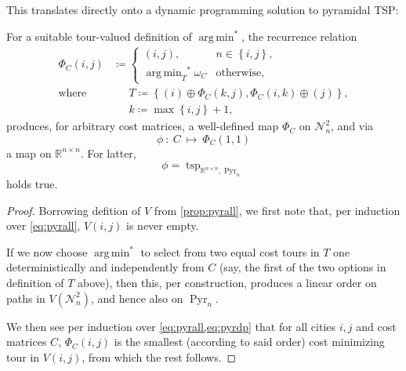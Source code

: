 \documentclass[index=totoc,bibliography=totoc]{scrartcl}
\newcommand{\annotation}[1]{\marginpar{\small\itshape\color{green}#1}}
\DeclareMathOperator*{\argmin}{arg\,min}
\numberwithin{equation}{section}
\numberwithin{figure}{section}
\numberwithin{table}{section}
\begin{document}
This translates directly onto a dynamic programming solution to pyramidal TSP:
\begin{corollary}
\label{cor:pyrdp}
\annotation{improve layout}
  For a suitable tour-valued definition of $\argmin^\ast$, the recurrence relation
  \begin{align}
    \label{eq:pyrdp}
    \Phi_C\left(i,j\right) & \coloneqq
    \begin{cases}
      \left(i,j\right), & n \in \left\{i,j\right\}, \\
      {\displaystyle \argmin_T}^\ast \omega_C & \text{otherwise},
    \end{cases}
    \\
    \text{where} & \phantom{\coloneqq}
    T \coloneqq
    \left\{
    \left(i\right) \oplus \Phi_C\left(k,j\right),
    \Phi_C\left(i,k\right) \oplus \left(j\right)
    \right\},
    \nonumber
    \\
    & \phantom{\coloneqq}
    k \coloneqq \max\left\{i,j\right\}+1,
    \nonumber
  \end{align}
  produces, for arbitrary cost matrices, a well-defined map $\Phi_C$ on $\mathcal{N}_n^2$,
  and via
  \[
    \phi~:~C~\mapsto~\Phi_C\left(1,1\right)
  \]
  a map on $\mathbb{R}^{n \times n}$.
  For latter,
  \[
    \phi = \operatorname{tsp}_{\mathbb{R}^{n \times n},\operatorname{Pyr}_n}
  \]
  holds true.
\end{corollary}
\begin{proof}
  Borrowing defition of $V$ from \cref{prop:pyrall}, we first note that,
  per induction over \eqref{eq:pyrall}, $V\left(i,j\right)$ is never empty.

  If we now choose $\argmin^\ast$ to select from two equal cost tours in
  $T$ one deterministically and independently from $C$ (say, the first of
  the two options in definition of $T$ above), then this, per construction,
  produces a linear order on paths in $V\left(\mathcal{N}_n^2\right)$, and
  hence also on $\operatorname{Pyr}_n$.

  We then see per induction over \cref{eq:pyrall,eq:pyrdp} that for all
  cities $i,j$ and cost matrices $C$, $\Phi_C\left(i,j\right)$ is the
  smallest (according to said order) cost minimizing tour in $V\left(i,j\right)$,
  from which the rest follows.
\end{proof}
\end{document}
